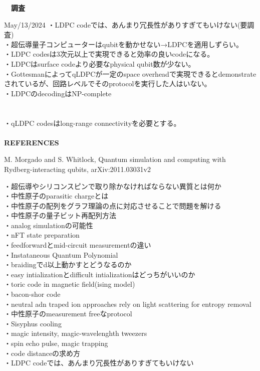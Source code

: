 \documentclass[a4paper,10.5pt]{ltjsarticle}
\begin{document}
\centerline
{\huge \bfseries　調査}
\rightline
{May/13/2024}
\leftline
{}
・LDPC codeでは、あんまり冗長性がありすぎてもいけない(要調査)\\
・超伝導量子コンピューターはqubitを動かせない→LDPCを適用しずらい。\\
・LDPC codesは3次元以上で実現できると効率の良いcodeになる。\\
・LDPCはsurface codeより必要なphysical qubit数が少ない。\\
・GottesmanによってqLDPCが一定のspace overheadで実現できるとdemonstrateされているが、回路レベルでそのprotocolを実行した人はいない。\\
・LDPCのdecodingはNP-complete\\
\\
\\
・qLDPC codesはlong-range connectivityを必要とする。\\
\\
{\Large \bfseries REFERENCES}
\begin{thebibliography}{1}
\vspace{-1.5cm}
   M. Morgado and S. Whitlock, Quantum simulation and computing with Rydberg-interacting qubits, arXiv:2011.03031v2
\end{thebibliography}
\vspace{50pt}
・超伝導やシリコンスピンで取り除かなければならない異質とは何か\\
・中性原子のparasitic chargeとは\\
・中性原子の配列をグラフ理論の点に対応させることで問題を解ける\\
・中性原子の量子ビット再配列方法\\
・analog simulationの可能性\\
・nFT state preparation\\
・feedforwardとmid-circuit measurementの違い\\
・Instataneous Quantum Polynomial\\
・braidingでd以上動かすとどうなるのか\\
・easy intializationとdifficult intializationはどっちがいいのか\\
・toric code in magnetic field(ising model)\\
・bacon-shor code\\
・neutral adn traped ion approaches rely on light scattering for entropy removal\\
・中性原子のmeasurement freeなprotocol\\
・Sisyphus cooling\\
・magic intensity, magic-wavelenghth tweezers\\
・spin echo pulse, magic trapping\\
・code distanceの求め方\\
・LDPC codeでは、あんまり冗長性がありすぎてもいけない\\
\\
\end{document}

